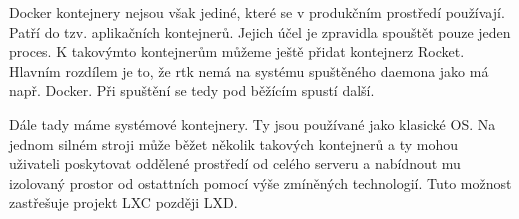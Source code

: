 Docker kontejnery nejsou však jediné, které se v produkčním prostředí používají. Patří do tzv. aplikačních kontejnerů. Jejich účel je zpravidla spouštět pouze jeden proces. K takovýmto kontejnerům můžeme ještě přidat kontejnerz Rocket. Hlavním rozdílem je to, že rtk nemá na systému spuštěného daemona jako má např. Docker. Při spuštění se tedy pod běžícím spustí další. 

Dále tady máme systémové kontejnery. Ty jsou používané jako klasické OS. Na jednom silném stroji může běžet několik takových kontejnerů a ty mohou uživateli poskytovat oddělené prostředí od celého serveru a nabídnout mu izolovaný prostor od ostattních pomocí výše zmíněných technologií. Tuto možnost zastřešuje projekt LXC později LXD.

